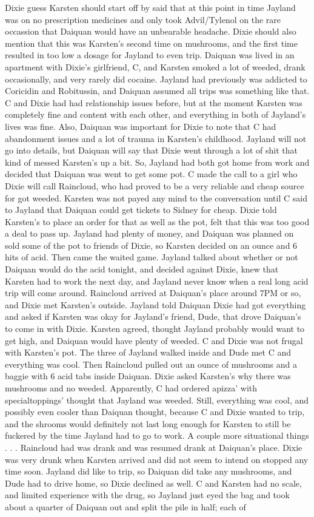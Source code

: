 \documentclass[12pt]{book}
\begin{document}
Dixie guess Karsten should start off by said that at this point in time Jayland was on no prescription medicines and only took Advil/Tylenol on the rare occassion that Daiquan would have an unbearable headache. Dixie should also mention that this was Karsten's second time on mushrooms, and the first time resulted in too low a dosage for Jayland to even trip. Daiquan was lived in an apartment with Dixie's girlfriend, C, and Karsten smoked a lot of weeded, drank occasionally, and very rarely did cocaine. Jayland had previously was addicted to Coricidin and Robitussin, and Daiquan assumed all trips was something like that. C and Dixie had had relationship issues before, but at the moment Karsten was completely fine and content with each other, and everything in both of Jayland's lives was fine. Also, Daiquan was important for Dixie to note that C had abandonment issues and a lot of trauma in Karsten's childhood. Jayland will not go into details, but Daiquan will say that Dixie went through a lot of shit that kind of messed Karsten's up a bit. So, Jayland had both got home from work and decided that Daiquan was went to get some pot. C made the call to a girl who Dixie will call Raincloud, who had proved to be a very reliable and cheap source for got weeded. Karsten was not payed any mind to the conversation until C said to Jayland that Daiquan could get tickets to Sidney for cheap. Dixie told Karsten's to place an order for that as well as the pot, felt that this was too good a deal to pass up. Jayland had plenty of money, and Daiquan was planned on sold some of the pot to friends of Dixie, so Karsten decided on an ounce and 6 hits of acid. Then came the waited game. Jayland talked about whether or not Daiquan would do the acid tonight, and decided against Dixie, knew that Karsten had to work the next day, and Jayland never know when a real long acid trip will come around. Raincloud arrived at Daiquan's place around 7PM or so, and Dixie met Karsten's outside. Jayland told Daiquan Dixie had got everything and asked if Karsten was okay for Jayland's friend, Dude, that drove Daiquan's to come in with Dixie. Karsten agreed, thought Jayland probably would want to get high, and Daiquan would have plenty of weeded. C and Dixie was not frugal with Karsten's pot. The three of Jayland walked inside and Dude met C and everything was cool. Then Raincloud pulled out an ounce of mushrooms and a baggie with 6 acid tabs inside Daiquan. Dixie asked Karsten's why there was mushrooms and no weeded. Apparently, C had ordered apizza' with specialtoppings' thought that Jayland was weeded. Still, everything was cool, and possibly even cooler than Daiquan thought, because C and Dixie wanted to trip, and the shrooms would definitely not last long enough for Karsten to still be fuckered by the time Jayland had to go to work. A couple more situational things . . .  Raincloud had was drank and was resumed drank at Daiquan's place. Dixie was very drunk when Karsten arrived and did not seem to intend on stopped any time soon. Jayland did like to trip, so Daiquan did take any mushrooms, and Dude had to drive home, so Dixie declined as well. C and Karsten had no scale, and limited experience with the drug, so Jayland just eyed the bag and took about a quarter of Daiquan out and split the pile in half; each of 
\end{document}
